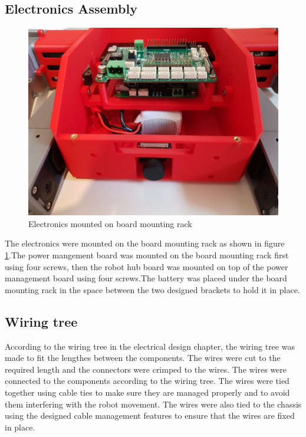 \subsection{Electronics Assembly}
\begin{figure}[h]
	\centering
	\includegraphics[width=0.5\linewidth]{electronics_mounted_on_board_mounting_rack}
	\caption{Electronics mounted on board mounting rack}
	\label{fig:electronicsmountedonboardmountingrack}
\end{figure}
The electronics were mounted on the board mounting rack as shown in figure \ref{fig:electronicsmountedonboardmountingrack}.The power mangement board was mounted on the board mounting rack first using four screws, then the robot hub board was mounted on top of the power management board using four screws.The battery was placed under the board mounting rack in the space between the two designed brackets to hold it in place.

\subsection{Wiring tree}
According to the wiring tree in the electrical design chapter, the wiring tree was made to fit the lengthes between the components. The wires were cut to the required length and the connectors were crimped to the wires. The wires were connected to the components according to the wiring tree. The wires were tied together using cable ties to make sure they are managed properly and to avoid them interfering with the robot movement. The wires were also tied to the chassis using the designed cable management features to ensure that the wires are fixed in place.
%



